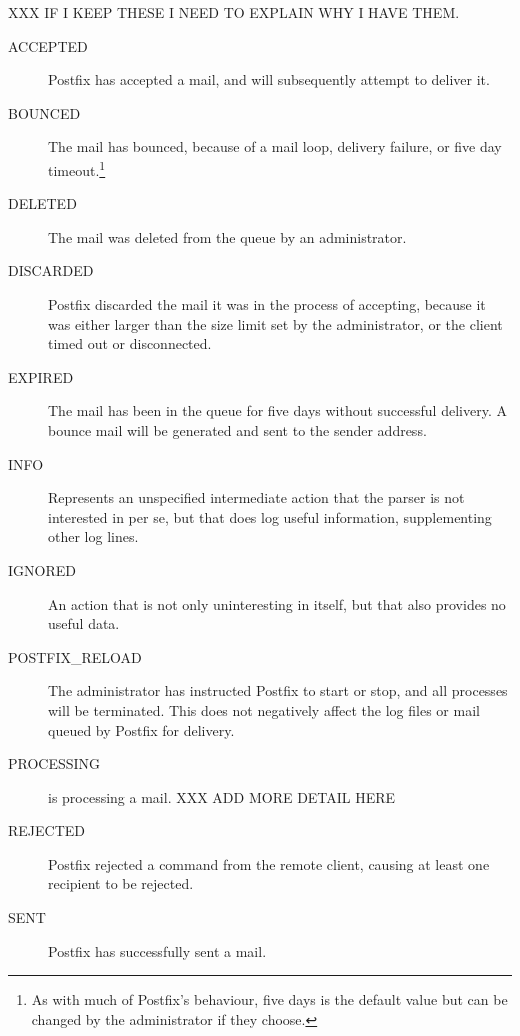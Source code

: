XXX IF I KEEP THESE I NEED TO EXPLAIN WHY I HAVE THEM\@.

\begin{description}

    \item [ACCEPTED] Postfix has accepted a mail, and will
        subsequently attempt to deliver it.

    \item [BOUNCED] The mail has bounced, because of a mail loop,
        delivery failure, or five day timeout.\footnote{As with
        much of Postfix's behaviour, five days is the default value
        but can be changed by the administrator if they choose.}

    \item [DELETED] The mail was deleted from the queue by an
        administrator.

    \item [DISCARDED] Postfix discarded the mail it was in the
        process of accepting, because it was either larger than the
        size limit set by the administrator, or the client timed
        out or disconnected.

    \item [EXPIRED] The mail has been in the queue for five days without
        successful delivery.  A bounce mail will be generated and sent to
        the sender address.

    \item [INFO] Represents an unspecified intermediate action that
        the parser is not interested in per se, but that does log
        useful information, supplementing other log lines.

    \item [IGNORED] An action that is not only uninteresting in
        itself, but that also provides no useful data.

    \item [POSTFIX\_RELOAD] The administrator has instructed
        Postfix to start or stop, and all  processes
        will be terminated.  This does not negatively affect the
        log files or mail queued by Postfix for delivery.

    \item [PROCESSING]  is processing a mail.
        XXX ADD MORE DETAIL HERE

    \item [REJECTED] Postfix rejected a command from the remote
        client, causing at least one recipient to be rejected.

    \item [SENT] Postfix has successfully sent a mail.

\end{description}

